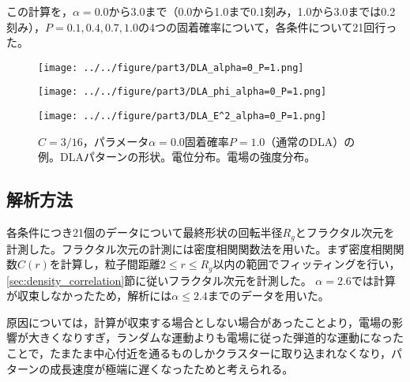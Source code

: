 \documentclass[autodetect-engine,dvi=dvipdfmx,a4paper,ja=standard,oneside,openany,11pt]{bxjsbook}
\begin{document}
この計算を，$\alpha=0.0$から$3.0$まで（0.0から1.0まで0.1刻み，1.0から3.0までは0.2刻み），$P=0.1,0.4,0.7,1.0$の4つの固着確率について，各条件について21回行った。

\begin{figure}[htbp]
  \begin{minipage}{0.32\hsize}
    \subcaption{}
    \centering
    \texttt{[image: ../../figure/part3/DLA\_alpha=0\_P=1.png]}
    \label{fig:DLA_alpha_0_P_1}
  \end{minipage}
  \begin{minipage}{0.32\hsize}
    \subcaption{}
    \centering
    \texttt{[image: ../../figure/part3/DLA\_phi\_alpha=0\_P=1.png]}
    \label{fig:DLA_phi_alpha_0_P_1}
  \end{minipage}
  \begin{minipage}{0.32\hsize}
    \subcaption{}
    \centering
    \texttt{[image: ../../figure/part3/DLA\_E^2\_alpha=0\_P=1.png]}
    \label{fig:DLA_E_alpha_0_P_1}
  \end{minipage}
  \caption{$C=3/16$，パラメータ$\alpha=0.0$固着確率$P=1.0$（通常のDLA）の例。DLAパターンの形状。電位分布。電場の強度分布。}
  \label{fig:DLA_ex}
\end{figure}

\subsection{解析方法}
各条件につき21個のデータについて最終形状の回転半径$R_g$とフラクタル次元を計測した。フラクタル次元の計測には密度相関関数法を用いた。まず密度相関関数$C(r)$を計算し，粒子間距離$2\leq r\leq R_g$以内の範囲でフィッティングを行い，\ref{sec:density_correlation}節に従いフラクタル次元を計測した。
$\alpha=2.6$では計算が収束しなかったため，解析には$\alpha\leq2.4$までのデータを用いた。

原因については，計算が収束する場合としない場合があったことより，電場の影響が大きくなりすぎ，ランダムな運動よりも電場に従った弾道的な運動になったことで，たまたま中心付近を通るものしかクラスターに取り込まれなくなり，パターンの成長速度が極端に遅くなったためと考えられる。

\ifdraft{
  
  
}{}
\end{document}
